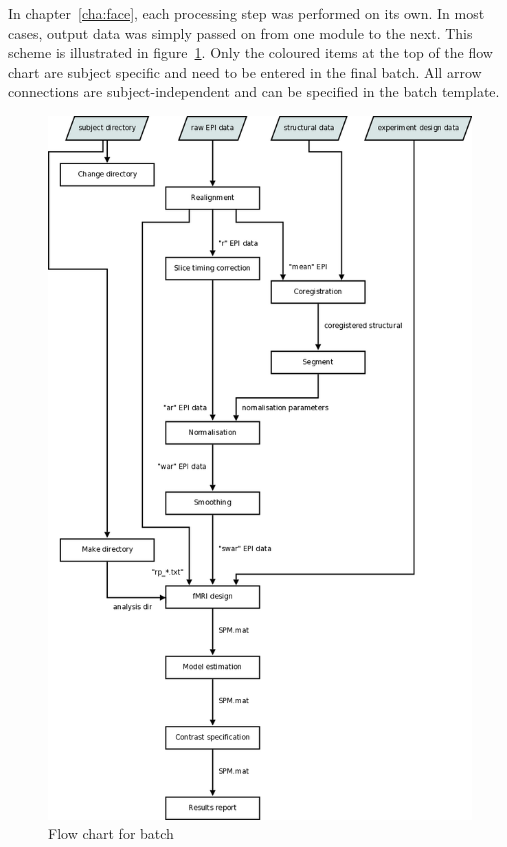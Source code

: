 \documentclass[a4paper]{book}
\begin{document}
In chapter~\ref{cha:face}, each processing step was performed on its own. In
most cases, output data was simply passed on from one module to the next. This
scheme is illustrated in figure~\ref{fig:flow}. Only the coloured items at the
top of the flow chart are subject specific and need to be entered in the final
batch. All arrow connections are subject-independent and can be specified in
the batch template.

\begin{figure}
  \centering
  \includegraphics[height=.9\textheight]{flow}
  \caption{Flow chart for batch}
  \label{fig:flow}
\end{figure}
\end{document}
